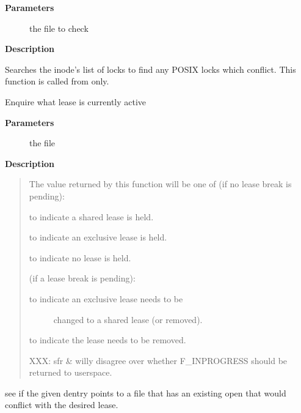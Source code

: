 \documentclass[a4paper,8pt,english]{sphinxmanual}
\begin{document}
\textbf{Parameters}
\begin{description}
\item[{}] \leavevmode
the file to check

\end{description}

\textbf{Description}

Searches the inode's list of locks to find any POSIX locks which conflict.
This function is called from  only.

\begin{fulllineitems}
\label{filesystems/index:c.fcntl_getlease}
Enquire what lease is currently active

\end{fulllineitems}


\textbf{Parameters}
\begin{description}
\item[{}] \leavevmode
the file

\end{description}

\textbf{Description}
\begin{quote}

The value returned by this function will be one of
(if no lease break is pending):

 to indicate a shared lease is held.

 to indicate an exclusive lease is held.

 to indicate no lease is held.

(if a lease break is pending):
\begin{description}
\item[{ to indicate an exclusive lease needs to be}] \leavevmode
changed to a shared lease (or removed).

\end{description}

 to indicate the lease needs to be removed.

XXX: sfr \& willy disagree over whether F\_INPROGRESS
should be returned to userspace.
\end{quote}

\begin{fulllineitems}
\label{filesystems/index:c.check_conflicting_open}
see if the given dentry points to a file that has an existing open that would conflict with the desired lease.

\end{fulllineitems}
\end{document}
